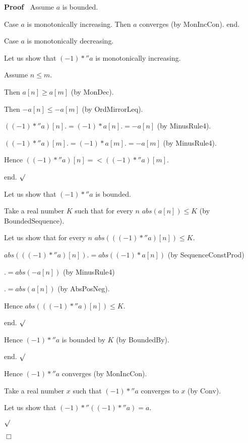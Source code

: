\documentclass{article}
\newenvironment{forthel}{\begin{leftbar}}{\end{leftbar}}
\newenvironment{proof}{\noindent\textbf{Proof\ }}{\hspace*{\fill}$\Box$\medskip}
\newenvironment{subproof}{\begin{list}{}{}
		\item[\text{Proof}]}{\hfill $\surd$ \end{list}}
\begin{document}
\begin{forthel}
\begin{proof}
		Assume $a$ is bounded.
		
		Case $a$ is monotonically increasing. Then $a$ converges (by MonIncCon). 
		end.
		
		Case $a$ is monotonically decreasing.
		
		\begin{subproof}
			Let us show that $(-1) *'' a$ is monotonically increasing.
			
			\begin{subproof}
				Assume $n \leq m$.
				
				Then $a[n] \geq a[m]$ (by MonDec).
				
				Then $-a[n] \leq -a[m]$ (by OrdMirrorLeq).
				
				$((-1) *'' a)[n] .= (-1) * a[n]
				.= -a[n]$ (by MinusRule4).
				
				$((-1) *'' a)[m] .= (-1) * a[m]
				.= -a[m]$ (by MinusRule4).
				
				Hence $((-1) *'' a)[n] =< ((-1) *'' a)[m]$.
				
				end.
			\end{subproof}
			
			Let us show that $(-1) *'' a$ is bounded.
			
			\begin{subproof}
				Take a real number $K$ such that for every $n$ $abs(a[n]) \leq K$ (by BoundedSequence).
				
				Let us show that for every $n$ $abs(((-1) *'' a)[n]) \leq K$.
				
				\begin{subproof}
					$abs(((-1) *'' a)[n]) .= abs((-1) * a[n])$ (by SequenceConstProd)
					
					$.= abs(-a[n])$ (by MinusRule4)
					
					$.= abs(a[n])$ (by AbsPosNeg).
					
					Hence $abs(((-1) *'' a)[n]) \leq K$.
					
					end.
				\end{subproof}
				
				Hence $(-1) *'' a$ is bounded by $K$ (by BoundedBy).
				
				end.
			\end{subproof}
			
			Hence $(-1) *'' a$ converges (by MonIncCon).
			
			Take a real number $x$ such that $(-1) *'' a$ converges to $x$ (by Conv).
			
			Let us show that $(-1) *'' ((-1) *'' a) = a$.
			

\end{subproof}
\end{proof}
\end{forthel}
\end{document}
